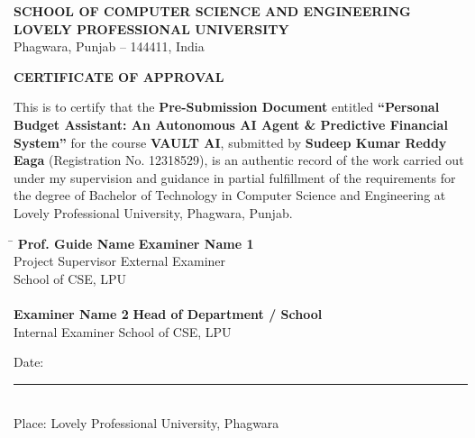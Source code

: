 \documentclass[12pt,a4paper,oneside]{report}
\newcommand*{\name}{Sudeep Kumar Reddy Eaga}
\newcommand*{\id}{12318529}
\newcommand*{\course}{VAULT AI}
\newcommand*{\assignment}{Pre-Submission Document}
\begin{document}
\newpage

\thispagestyle{plain}
\begin{center}
    \Large \textbf{SCHOOL OF COMPUTER SCIENCE AND ENGINEERING} \\[0.2cm]
    \large \textbf{LOVELY PROFESSIONAL UNIVERSITY} \\[0.2cm]
    Phagwara, Punjab -- 144411, India
\end{center}

\vspace{1.0cm}

\begin{center}
    \Large \textbf{CERTIFICATE OF APPROVAL}
\end{center}

\vspace{0.5cm}

\noindent This is to certify that the \textbf{\assignment} entitled \textbf{``Personal Budget Assistant: An Autonomous AI Agent \& Predictive Financial System''} for the course \textbf{\course}, submitted by \textbf{\name} (Registration No. \id), is an authentic record of the work carried out under my supervision and guidance in partial fulfillment of the requirements for the degree of Bachelor of Technology in Computer Science and Engineering at Lovely Professional University, Phagwara, Punjab.

\vspace{3.0cm}

\noindent
\begin{tabbing}
\hspace{8cm} \= \kill
\textbf{Prof. Guide Name} \> \textbf{Examiner Name 1} \\
Project Supervisor \> External Examiner \\
School of CSE, LPU \> \\
\vspace{2cm} \\
\textbf{Examiner Name 2} \> \textbf{Head of Department / School} \\
Internal Examiner \> School of CSE, LPU
\end{tabbing}

\vspace{1.0cm}
\noindent Date: \rule{4cm}{0.4pt} \\
\noindent Place: Lovely Professional University, Phagwara
\end{document}
